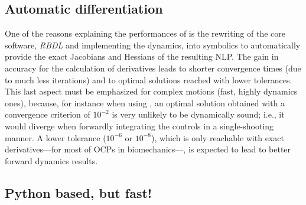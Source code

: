 \subsection{Automatic differentiation}

One of the reasons explaining the performances of \bioptim is the rewriting of the core software, \textit{RBDL} \cite{felis2016rbdl} and \biorbd implementing the dynamics, into \casadi symbolics to automatically provide the exact Jacobians and Hessians of the resulting NLP.  
The gain in accuracy for the calculation of derivatives leads to shorter convergence times (due to much less iterations) and to optimal solutions reached with lower tolerances.
This last aspect must be emphasized for complex motions (fast, highly dynamics ones), because, for instance when using \ipopt, an optimal solution obtained with a convergence criterion of $10^{-2}$ is very unlikely to be dynamically sound; 
i.e., it would diverge when forwardly integrating the controls in a single-shooting manner. 
A lower tolerance ($10^{-6}$ or $10^{-8}$), which is only reachable with exact derivatives---for most of OCPs in biomechanics---, is expected to lead to better forward dynamics results.

\subsection{Python based, but fast!}

